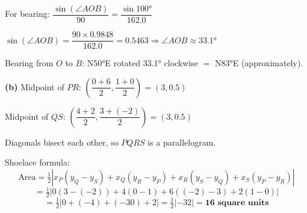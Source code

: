 \documentclass[addpoints]{exam}
\begin{document}
\begin{questions}
\begin{solution}[11cm]
For bearing: $\dfrac{\sin(\angle AOB)}{90} = \dfrac{\sin\ang{100}}{162.0}$

$\sin(\angle AOB) = \dfrac{90 \times 0.9848}{162.0} = 0.5463 \Rightarrow \angle AOB \approx \ang{33.1}$

Bearing from $O$ to $B$: N\ang{50}E rotated \ang{33.1} clockwise $=$ N\ang{83}E (approximately).

\textbf{(b)} Midpoint of $PR$: $\left(\dfrac{0+6}{2}, \dfrac{1+0}{2}\right) = (3, 0.5)$

Midpoint of $QS$: $\left(\dfrac{4+2}{2}, \dfrac{3+(-2)}{2}\right) = (3, 0.5)$ \checkmark

Diagonals bisect each other, so $PQRS$ is a parallelogram.

Shoelace formula:
\[
\text{Area} = \tfrac{1}{2}|x_P(y_Q - y_S) + x_Q(y_R - y_P) + x_R(y_S - y_Q) + x_S(y_P - y_R)|
\]
\[= \tfrac{1}{2}|0(3-(-2)) + 4(0-1) + 6((-2)-3) + 2(1-0)|\]
\[= \tfrac{1}{2}|0 + (-4) + (-30) + 2| = \tfrac{1}{2}|-32| = \mathbf{16 \text{ square units}}\]
\end{solution}

\end{questions}
\end{document}

